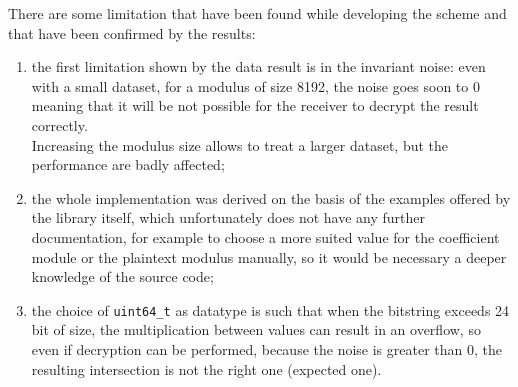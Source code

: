 \documentclass[10pt]{extarticle}
\begin{document}
\newpage
There are some limitation that have been found while developing the scheme and that have been confirmed by the results:
\begin{enumerate}
	\item the first limitation shown by the data result is in the invariant noise: even with a small dataset, for a modulus of size 8192, the noise goes soon to 0 meaning that it will be not possible for the receiver to decrypt the result correctly.\\Increasing the modulus size allows to treat a larger dataset, but the performance are badly affected;
	\item the whole implementation was derived on the basis of the examples offered by the library itself, which unfortunately does not have any further documentation, for example to choose a more suited value for the coefficient module or the plaintext modulus manually, so it would be necessary a deeper knowledge of the source code;
	\item the choice of \texttt{uint64\_t} as datatype is such that when the bitstring exceeds 24 bit of size, the multiplication between values can result in an overflow, so even if decryption can be performed, because the noise is greater than 0, the resulting intersection is not the right one (expected one).
\end{enumerate}
\end{document}
